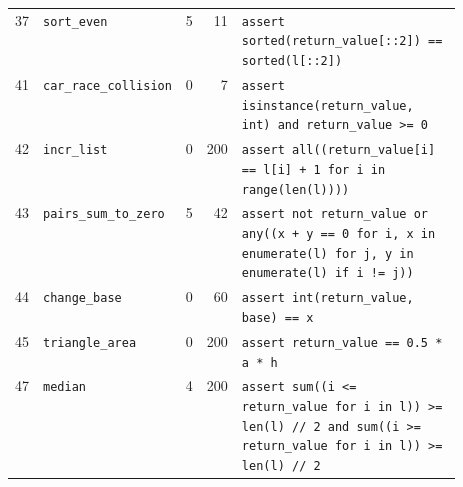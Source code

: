 \begin{footnotesize}
\begin{longtable}{@{}r l r r p{0.52\linewidth}@{}}
37 & \texttt{sort\_even} & 5 & 11 & \texttt{assert \allowbreak{}sorted(\allowbreak{}return\_value[\allowbreak{}:\allowbreak{}:\allowbreak{}2]\allowbreak{})\allowbreak{} \allowbreak{}=\allowbreak{}=\allowbreak{} \allowbreak{}sorted(\allowbreak{}l[\allowbreak{}:\allowbreak{}:\allowbreak{}2]\allowbreak{})\allowbreak{}} \\
41 & \texttt{car\_race\_collision} & 0 & 7 & \texttt{assert \allowbreak{}isinstance(\allowbreak{}return\_value,\allowbreak{} \allowbreak{}int)\allowbreak{} \allowbreak{}and \allowbreak{}return\_value \allowbreak{}>\allowbreak{}=\allowbreak{} \allowbreak{}0} \\
42 & \texttt{incr\_list} & 0 & 200 & \texttt{assert \allowbreak{}all(\allowbreak{}(\allowbreak{}return\_value[\allowbreak{}i]\allowbreak{} \allowbreak{}=\allowbreak{}=\allowbreak{} \allowbreak{}l[\allowbreak{}i]\allowbreak{} \allowbreak{}+\allowbreak{} \allowbreak{}1 \allowbreak{}for \allowbreak{}i \allowbreak{}in \allowbreak{}range(\allowbreak{}len(\allowbreak{}l)\allowbreak{})\allowbreak{})\allowbreak{})\allowbreak{}} \\
43 & \texttt{pairs\_sum\_to\_zero} & 5 & 42 & \texttt{assert \allowbreak{}not \allowbreak{}return\_value \allowbreak{}or \allowbreak{}any(\allowbreak{}(\allowbreak{}x \allowbreak{}+\allowbreak{} \allowbreak{}y \allowbreak{}=\allowbreak{}=\allowbreak{} \allowbreak{}0 \allowbreak{}for \allowbreak{}i,\allowbreak{} \allowbreak{}x \allowbreak{}in \allowbreak{}enumerate(\allowbreak{}l)\allowbreak{} \allowbreak{}for \allowbreak{}j,\allowbreak{} \allowbreak{}y \allowbreak{}in \allowbreak{}enumerate(\allowbreak{}l)\allowbreak{} \allowbreak{}if \allowbreak{}i \allowbreak{}!=\allowbreak{} \allowbreak{}j)\allowbreak{})\allowbreak{}} \\
44 & \texttt{change\_base} & 0 & 60 & \texttt{assert \allowbreak{}int(\allowbreak{}return\_value,\allowbreak{} \allowbreak{}base)\allowbreak{} \allowbreak{}=\allowbreak{}=\allowbreak{} \allowbreak{}x} \\
45 & \texttt{triangle\_area} & 0 & 200 & \texttt{assert \allowbreak{}return\_value \allowbreak{}=\allowbreak{}=\allowbreak{} \allowbreak{}0.\allowbreak{}5 \allowbreak{}*\allowbreak{} \allowbreak{}a \allowbreak{}*\allowbreak{} \allowbreak{}h} \\
47 & \texttt{median} & 4 & 200 & \texttt{assert \allowbreak{}sum(\allowbreak{}(\allowbreak{}i \allowbreak{}<\allowbreak{}=\allowbreak{} \allowbreak{}return\_value \allowbreak{}for \allowbreak{}i \allowbreak{}in \allowbreak{}l)\allowbreak{})\allowbreak{} \allowbreak{}>\allowbreak{}=\allowbreak{} \allowbreak{}len(\allowbreak{}l)\allowbreak{} \allowbreak{}/\allowbreak{}/\allowbreak{} \allowbreak{}2 \allowbreak{}and \allowbreak{}sum(\allowbreak{}(\allowbreak{}i \allowbreak{}>\allowbreak{}=\allowbreak{} \allowbreak{}return\_value \allowbreak{}for \allowbreak{}i \allowbreak{}in \allowbreak{}l)\allowbreak{})\allowbreak{} \allowbreak{}>\allowbreak{}=\allowbreak{} \allowbreak{}len(\allowbreak{}l)\allowbreak{} \allowbreak{}/\allowbreak{}/\allowbreak{} \allowbreak{}2} \\

\end{longtable}
\end{footnotesize}
